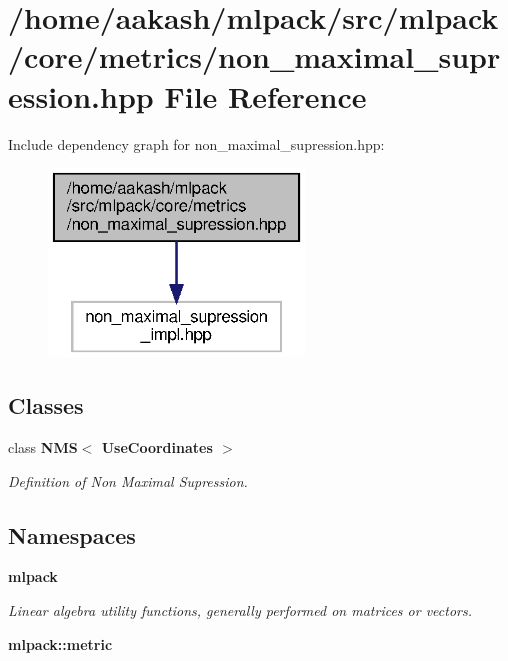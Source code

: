 \section{/home/aakash/mlpack/src/mlpack/core/metrics/non\+\_\+maximal\+\_\+supression.hpp File Reference}
\label{non__maximal__supression_8hpp}
Include dependency graph for non\+\_\+maximal\+\_\+supression.\+hpp\+:
\nopagebreak
\begin{figure}[H]
\begin{center}
\leavevmode
\includegraphics[width=193pt]{non__maximal__supression_8hpp__incl}
\end{center}
\end{figure}
\subsection*{Classes}
\begin{DoxyCompactItemize}
\item 
class \textbf{ N\+M\+S$<$ Use\+Coordinates $>$}
\begin{DoxyCompactList}\small\item\em Definition of Non Maximal Supression. \end{DoxyCompactList}\end{DoxyCompactItemize}
\subsection*{Namespaces}
\begin{DoxyCompactItemize}
\item 
 \textbf{ mlpack}
\begin{DoxyCompactList}\small\item\em Linear algebra utility functions, generally performed on matrices or vectors. \end{DoxyCompactList}\item 
 \textbf{ mlpack\+::metric}
\end{DoxyCompactItemize}


